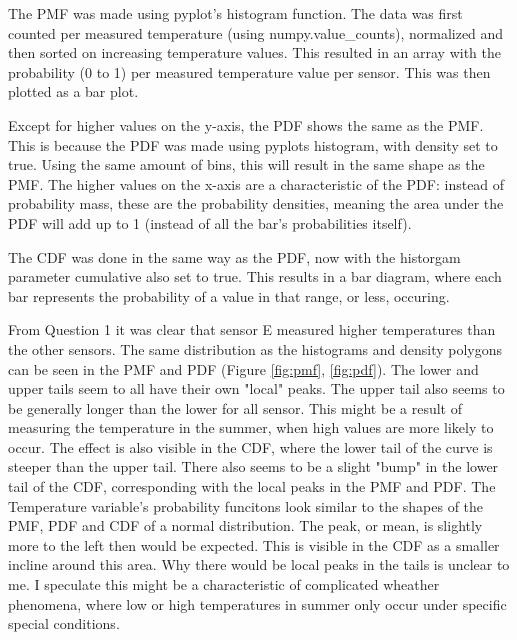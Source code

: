 \documentclass{report}
\begin{document}
	 The PMF was made using pyplot's histogram function. The data was first counted per measured temperature (using numpy.value\_counts), normalized and then sorted on increasing temperature values. This resulted in an array with the probability (0 to 1) per measured temperature value per sensor. This was then plotted as a bar plot.
	
	Except for higher values on the y-axis, the PDF shows the same as the PMF. This is because the PDF was made using pyplots histogram, with density set to true. Using the same amount of bins, this will result in the same shape as the PMF. The higher values on the x-axis are a characteristic of the PDF: instead of probability mass, these are the probability densities, meaning the area under the PDF will add up to 1 (instead of all the bar's probabilities itself).
	
	The CDF was done in the same way as the PDF, now with the historgam parameter cumulative also set to true. This results in a bar diagram, where each bar represents the probability of a value in that range, or less, occuring.
	
	From Question 1 it was clear that sensor E measured higher temperatures than the other sensors. The same distribution as the histograms and density polygons can be seen in the PMF and PDF (Figure \ref{fig:pmf}, \ref{fig:pdf}). The lower and upper tails seem to all have their own "local" peaks. The upper tail also seems to be generally longer than the lower for all sensor. This might be a result of measuring the temperature in the summer, when high values are more likely to occur. The effect is also visible in the CDF, where the lower tail of the curve is steeper than the upper tail. There also seems to be a slight "bump" in the lower tail of the CDF, corresponding with the local peaks in the PMF and PDF. The Temperature variable's probability funcitons look similar to the shapes of the PMF, PDF and CDF of a normal distribution. The peak, or mean, is slightly more to the left then would be expected. This is visible in the CDF as a smaller incline around this area. Why there would be local peaks in the tails is unclear to me. I speculate this might be a characteristic of complicated wheather phenomena, where low or high temperatures in summer only occur under specific special conditions.
	
\end{document}
